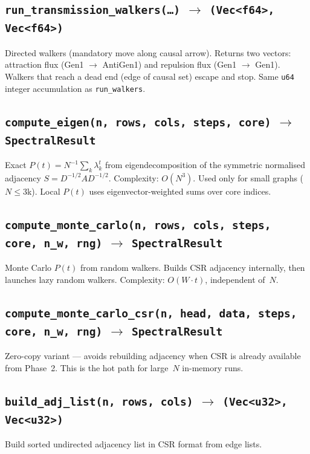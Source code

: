 \documentclass[11pt, a4paper, openany]{book}
\newcommand{\code}[1]{\texttt{#1}}
\newcommand{\func}[1]{\texttt{\color{structure}#1}}
\begin{document}
\subsection{\func{run\_transmission\_walkers(\ldots)} $\to$ \code{(Vec<f64>, Vec<f64>)}}

Directed walkers (mandatory move along causal arrow).  Returns two vectors:
attraction flux (Gen1 $\to$ AntiGen1) and repulsion flux (Gen1 $\to$ Gen1).
Walkers that reach a dead end (edge of causal set) escape and stop.  Same
\code{u64} integer accumulation as \func{run\_walkers}.

\subsection{\func{compute\_eigen(n, rows, cols, steps, core)} $\to$ \code{SpectralResult}}

Exact $P(t) = N^{-1} \sum_k \lambda_k^t$ from eigendecomposition of the
symmetric normalised adjacency $S = D^{-1/2}AD^{-1/2}$.  Complexity: $O(N^3)$.
Used only for small graphs ($N \le 3$k).  Local $P(t)$ uses
eigenvector-weighted sums over core indices.

\subsection{\func{compute\_monte\_carlo(n, rows, cols, steps, core, n\_w, rng)} $\to$ \code{SpectralResult}}

Monte Carlo $P(t)$ from random walkers.  Builds CSR adjacency internally, then
launches lazy random walkers.  Complexity: $O(W \cdot t)$, independent of~$N$.

\subsection{\func{compute\_monte\_carlo\_csr(n, head, data, steps, core, n\_w, rng)} $\to$ \code{SpectralResult}}

Zero-copy variant --- avoids rebuilding adjacency when CSR is already available
from Phase~2.  This is the hot path for large~$N$ in-memory runs.

\subsection{\func{build\_adj\_list(n, rows, cols)} $\to$ \code{(Vec<u32>, Vec<u32>)}}

Build sorted undirected adjacency list in CSR format from edge lists.
\end{document}

